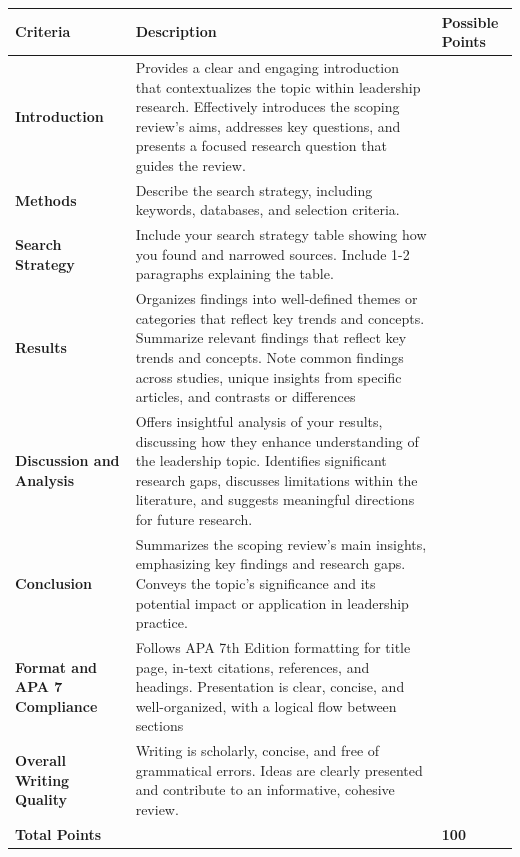 \documentclass[
  letterpaper,
  DIV=11,
  numbers=noendperiod]{scrreprt}
\begin{document}
\begin{longtable}[]{@{}
  >{\raggedright\arraybackslash}p{}
  >{\raggedright\arraybackslash}p{}
  >{\raggedright\arraybackslash}p{}@{}}
\toprule\noalign{}
\begin{minipage}[b]{\linewidth}\raggedright
\textbf{Criteria}
\end{minipage} & \begin{minipage}[b]{\linewidth}\raggedright
\textbf{Description}
\end{minipage} & \begin{minipage}[b]{\linewidth}\raggedright
\textbf{Possible Points}
\end{minipage} \\
\midrule\noalign{}
\endhead
\bottomrule\noalign{}
\endlastfoot
\textbf{Introduction} & Provides a clear and engaging introduction that
contextualizes the topic within leadership research. Effectively
introduces the scoping review's aims, addresses key questions, and
presents a focused research question that guides the review. & 10 \\
\textbf{Methods} & Describe the search strategy, including keywords,
databases, and selection criteria. & 15 \\
\textbf{Search Strategy} & Include your search strategy table showing
how you found and narrowed sources. Include 1-2 paragraphs explaining
the table. & 10 \\
\textbf{Results} & Organizes findings into well-defined themes or
categories that reflect key trends and concepts. Summarize relevant
findings that reflect key trends and concepts. Note common findings
across studies, unique insights from specific articles, and contrasts or
differences & 25 \\
\textbf{Discussion and Analysis} & Offers insightful analysis of your
results, discussing how they enhance understanding of the leadership
topic. Identifies significant research gaps, discusses limitations
within the literature, and suggests meaningful directions for future
research. & 20 \\
\textbf{Conclusion} & Summarizes the scoping review's main insights,
emphasizing key findings and research gaps. Conveys the topic's
significance and its potential impact or application in leadership
practice. & 5 \\
\textbf{Format and APA 7 Compliance} & Follows APA 7th Edition
formatting for title page, in-text citations, references, and headings.
Presentation is clear, concise, and well-organized, with a logical flow
between sections & 10 \\
\textbf{Overall Writing Quality} & Writing is scholarly, concise, and
free of grammatical errors. Ideas are clearly presented and contribute
to an informative, cohesive review. & 5 \\
\textbf{Total Points} & & \textbf{100} \\
\end{longtable}
\end{document}
